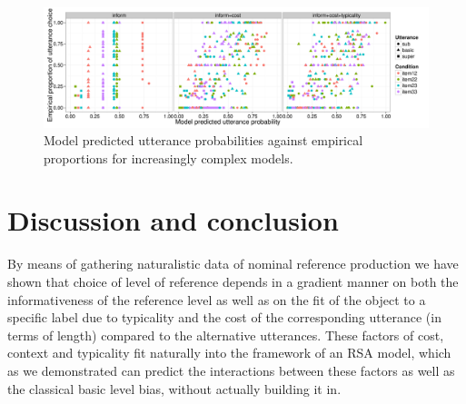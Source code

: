 \documentclass[10pt,letterpaper]{article}
\newcommand{\ndg}[1]{\textcolor{Green}{[ndg: #1]}}
\begin{document}
\begin{figure}[ht!]
\centering
\includegraphics[width=\textwidth]{graphs/scatterplot}
\caption{Model predicted utterance probabilities against empirical proportions for increasingly complex models.}
 \label{fig:scatterplot}
\end{figure}

\section{\bf Discussion and conclusion}

By means of gathering naturalistic data of nominal reference production we have shown that choice of level of reference depends in a gradient manner on both the informativeness of the reference level as well as on the fit of the object to a specific label due to typicality and the cost of the corresponding utterance (in terms of length) compared to the alternative utterances. These factors of cost, context and typicality fit naturally into the framework of an RSA model, which as we demonstrated can predict the interactions between these factors as well as the classical basic level bias, without actually building it in.

\end{document}
